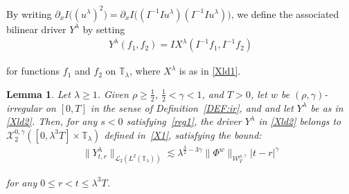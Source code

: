 \documentclass[letterpaper, 11pt,  reqno]{amsart}
\newtheorem{lemma}[theorem]{Lemma}
\newcommand{\1}{\hspace{0.5mm}\text{I}\hspace{0.5mm}}
\newcommand{\noi}{\noindent}
\newcommand{\T}{\mathbb{T}}
\newcommand{\g}{\gamma}
\newcommand{\ld}{\lambda}
\newcommand{\les}{\lesssim}
\newcommand{\cL}{\mathcal{L}}
\newcommand{\cX}{\mathcal{X}}
\newcommand{\W}{\mathcal{W}}
\numberwithin{equation}{section}
\numberwithin{theorem}{section}
\begin{document}
\noi
By  writing
$\partial_x I\big((u^{\ld} )^2\big) = \partial_x I\big((I^{-1}Iu^{\ld} )(I^{-1}Iu^{\ld} )\big)$, 
we define the associated bilinear driver $Y^\ld$ by setting
\begin{align}
Y^\ld (f_1, f_2) = I X^{\ld} (I^{-1} f _1,  I^{-1} f _2)
\label{Xld2}
\end{align}


\noi
for functions $f_1$ and $f_2$ on $\T_\ld$, 
where $X^\ld$ is as in \eqref{Xld1}.









\begin{lemma}
\label{LEM:tri4}
Let $\ld \ge 1$.
Given $\rho \ge\frac 12$,  $\frac 12 < \g < 1$,  and $T> 0$, 
let  $w$ be $(\rho,\g)$-irregular on $[0, T]$ in the sense of Definition~\ref{DEF:ir}, 
and and let $Y^\ld$ be as in \eqref{Xld2}.
Then, for any $s < 0$
satisfying~\eqref{reg1}, 
the driver $Y^\ld$  in \eqref{Xld2}
belongs to $ \cX^{0, \g}_2([0, \ld^3T] \times \T_\ld)$ defined in~\eqref{X1}, 
satisfying the bound\textup{:}
\begin{align}
 \| Y^{\ld}_{t,r}  \|_{\cL_2 ( L^2(\T_\ld)) }
 \les
 \ld^{ \frac32  -3\g} 
  \|\Phi^{w}\|_{\W_{T}^{\rho, \g}}
 |t-r|^{\g}
\label{IF1}
\end{align}


\noi
for any $0\leq r<t \leq \ld^3T$.


\end{lemma}
\end{document}
